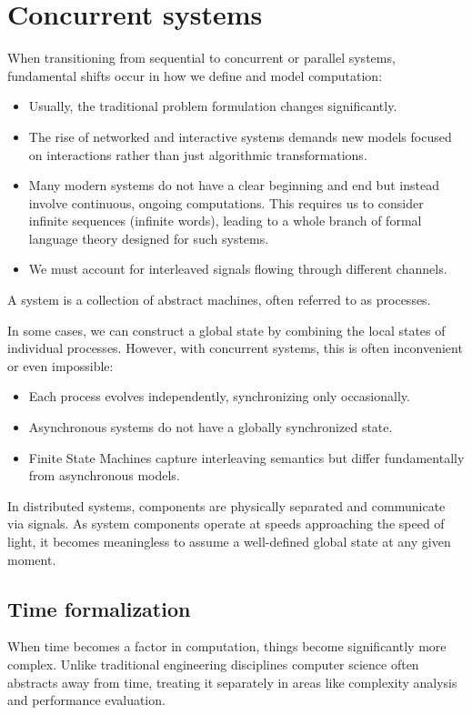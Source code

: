 \section{Concurrent systems}

When transitioning from sequential to concurrent or parallel systems, fundamental shifts occur in how we define and model computation:
\begin{itemize}
    \item Usually, the traditional problem formulation changes significantly.
    \item The rise of networked and interactive systems demands new models focused on interactions rather than just algorithmic transformations.
    \item Many modern systems do not have a clear beginning and end but instead involve continuous, ongoing computations.
        This requires us to consider infinite sequences (infinite words), leading to a whole branch of formal language theory designed for such systems.
    \item We must account for interleaved signals flowing through different channels.
\end{itemize}
\begin{definition}
    A system is a collection of abstract machines, often referred to as processes.
\end{definition}
In some cases, we can construct a global state by combining the local states of individual processes. 
However, with concurrent systems, this is often inconvenient or even impossible:
\begin{itemize}
    \item Each process evolves independently, synchronizing only occasionally.
    \item Asynchronous systems do not have a globally synchronized state.
    \item Finite State Machines capture interleaving semantics but differ fundamentally from asynchronous models.
\end{itemize}
\noindent In distributed systems, components are physically separated and communicate via signals.
As system components operate at speeds approaching the speed of light, it becomes meaningless to assume a well-defined global state at any given moment.

\subsection{Time formalization}
When time becomes a factor in computation, things become significantly more complex. 
Unlike traditional engineering disciplines computer science often abstracts away from time, treating it separately in areas like complexity analysis and performance evaluation.

